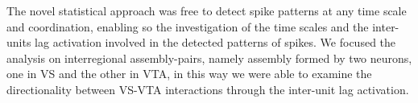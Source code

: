 The novel statistical approach was free to detect spike patterns at any time scale and coordination, enabling so the investigation of the time scales and the inter-units lag activation involved in the detected patterns of spikes. %
We focused the analysis on interregional assembly-pairs, namely assembly formed by two neurons, one in VS and the other in VTA, in this way we were able to examine the directionality between VS-VTA interactions through the inter-unit lag activation.\\%
